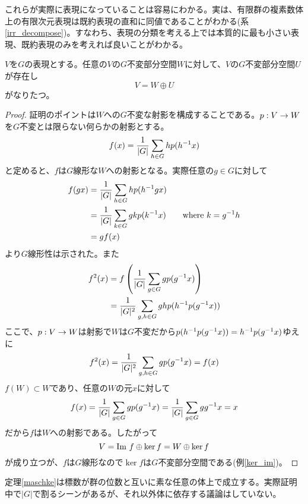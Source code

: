 \documentclass{ltjsreport}
\begin{document}
  これらが実際に表現になっていることは容易にわかる。実は、有限群の複素数体上の有限次元表現は既約表現の直和に同値であることがわかる(系\ref{irr_decompose})。すなわち、表現の分類を考える上では本質的に最も小さい表現、既約表現のみを考えれば良いことがわかる。

  \begin{theo}[Maschkeの定理]\label{maschke}
    $V$を$G$の表現とする。任意の$V$の$G$不変部分空間$W$に対して、$V$の$G$不変部分空間$U$が存在し
    \[
    V= W\oplus U
    \]
    がなりたつ。
  \end{theo}

  \begin{proof}
    証明のポイントは$W$への$G$不変な射影を構成することである。$p:V\rightarrow W$を$G$不変とは限らない何らかの射影とする。
    \[
    f(x)=\frac{1}{|G|}\sum_{h\in G} hp(h^{-1}x)
    \]
    と定めると、$f$は$G$線形な$W$への射影となる。実際任意の$g\in G$に対して
    \begin{align*}
      f(gx)&=\frac{1}{|G|}\sum_{h\in G} hp(h^{-1}gx)\\
      &=\frac{1}{|G|}\sum_{k\in G} gkp(k^{-1}x)\qquad \text{where $k=g^{-1}h$}\\
      &=gf(x)
    \end{align*}
    より$G$線形性は示された。また
    \begin{align*}
      f^2(x)&=f\left(\frac{1}{|G|}\sum_{g\in G}gp(g^{-1}x)\right)\\
      &=\frac{1}{|G|^2}\sum_{g,h\in G}ghp(h^{-1}p(g^{-1}x))
    \end{align*}
    ここで、$p:V\rightarrow W$は射影で$W$は$G$不変だから$p(h^{-1}p(g^{-1}x))=h^{-1}p(g^{-1}x)$ゆえに
    \begin{align*}
      f^2(x)=\frac{1}{|G|^2}\sum_{g,h\in G}gp(g^{-1}x)=f(x)
    \end{align*}
    $f(W)\subset W$であり、任意の$W$の元$x$に対して
    \[
    f(x)=\frac{1}{|G|}\sum_{g\in G}gp(g^{-1}x)=\frac{1}{|G|}\sum_{g\in G}gg^{-1}x=x  
    \]
    だから$f$は$W$への射影である。したがって
    \[
    V=\text{Im } f\oplus \ker f=W\oplus \ker f  
    \]
    が成り立つが、$f$は$G$線形なので$\ker f$は$G$不変部分空間である(例\ref{ker_im})。
  \end{proof}

  \begin{notice}
    定理\ref{maschke}は標数が群の位数と互いに素な任意の体上で成立する。実際証明中で$|G|$で割るシーンがあるが、それ以外体に依存する議論はしていない。
  \end{notice}
\end{document}
